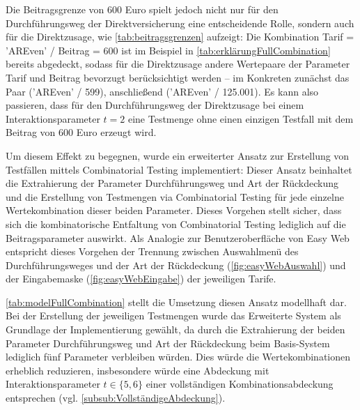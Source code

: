 Die Beitragsgrenze von 600 Euro spielt jedoch nicht nur für den Durchführungsweg der Direktversicherung eine entscheidende Rolle, sondern auch für die Direktzusage, wie \autoref{tab:beitragsgrenzen} aufzeigt: Die Kombination Tarif = 'AREven' / Beitrag = 600 ist im Beispiel in  \autoref{tab:erklärungFullCombination} bereits abgedeckt, sodass für die Direktzusage andere Wertepaare der Parameter Tarif und Beitrag bevorzugt berücksichtigt werden -- im Konkreten zunächst das Paar ('AREven' / 599), anschließend ('AREven' / 125.001). Es kann also passieren, dass für den Durchführungsweg der Direktzusage bei einem Interaktionsparameter $t=2$ eine Testmenge ohne einen einzigen Testfall mit dem Beitrag von 600 Euro erzeugt wird.

Um diesem Effekt zu begegnen, wurde ein erweiterter Ansatz zur Erstellung von Testfällen mittels Combinatorial Testing implementiert: Dieser Ansatz beinhaltet die Extrahierung der Parameter Durchführungsweg und Art der Rückdeckung und die Erstellung von Testmengen via Combinatorial Testing für jede einzelne Wertekombination dieser beiden Parameter. Dieses Vorgehen stellt sicher, dass sich die kombinatorische Entfaltung von Combinatorial Testing lediglich auf die Beitragsparameter auswirkt. Als Analogie zur Benutzeroberfläche von Easy Web entspricht dieses Vorgehen der Trennung zwischen Auswahlmenü des Durchführungsweges und der Art der Rückdeckung (\autoref{fig:easyWebAuswahl}) und der Eingabemaske (\autoref{fig:easyWebEingabe}) der jeweiligen Tarife. 

\autoref{tab:modelFullCombination} stellt die Umsetzung diesen Ansatz modellhaft dar. Bei der Erstellung der jeweiligen Testmengen wurde das Erweiterte System als Grundlage der Implementierung gewählt, da durch die Extrahierung der beiden Parameter Durchführungsweg und Art der Rückdeckung beim Basis-System lediglich fünf Parameter verbleiben würden. Dies würde die Wertekombinationen erheblich reduzieren, insbesondere würde eine Abdeckung mit Interaktionsparameter $t \in \{5,6\}$ einer vollständigen Kombinationsabdeckung entsprechen (vgl. \autoref{subsub:VollständigeAbdeckung}).

